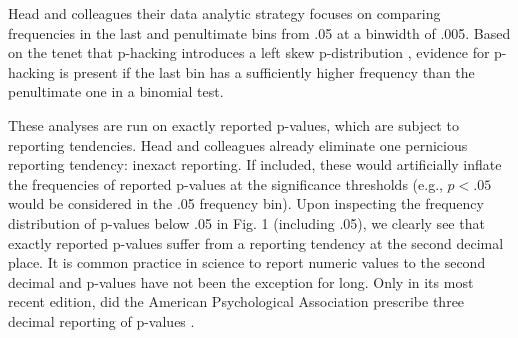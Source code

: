 Head and colleagues their data analytic strategy focuses on comparing frequencies in the last and penultimate bins from .05 at a binwidth of .005. Based on the tenet that p-hacking introduces a left skew p-distribution \cite{Simonsohn2014}, evidence for p-hacking is present if the last bin has a sufficiently higher frequency than the penultimate one in a binomial test. 

These analyses are run on exactly reported p-values, which are subject to reporting tendencies. Head and colleagues already eliminate one pernicious reporting tendency: inexact reporting. If included, these would artificially inflate the frequencies of reported p-values at the significance thresholds (e.g., $p<.05$ would be considered in the .05 frequency bin). Upon inspecting the frequency distribution of p-values below .05 in Fig. 1 (including .05), we clearly see that exactly reported p-values suffer from a reporting tendency at the second decimal place. It is common practice in science to report numeric values to the second decimal and p-values have not been the exception for long. Only in its most recent edition, did the American Psychological Association prescribe three decimal reporting of p-values .